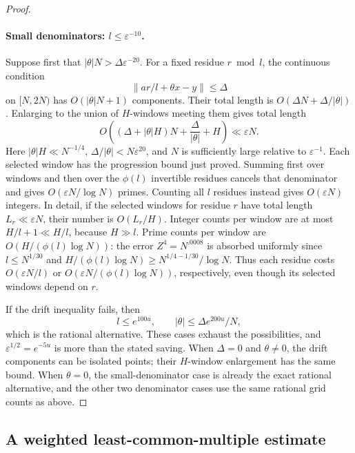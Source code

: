 \begin{proof}
\paragraph{Small denominators: $l\le\varepsilon^{-10}$.}
Suppose first that $|\theta|N>\Delta\varepsilon^{-20}$. For a fixed
residue $r\bmod l$, the continuous condition
\[
 \|ar/l+\theta x-y\|\le\Delta
\]
on $[N,2N)$ has $O(|\theta|N+1)$ components. Their total length is
$O(\Delta N+\Delta/|\theta|)$. Enlarging to the union of $H$-windows
meeting them gives total length
\[
 O\left((\Delta+|\theta|H)N+
              \frac{\Delta}{|\theta|}+H\right)
 \ll\varepsilon N.
\]
Here $|\theta|H\ll N^{-1/4}$,
$\Delta/|\theta|<N\varepsilon^{20}$, and $N$ is sufficiently large
relative to $\varepsilon^{-1}$. Each selected window has the
progression bound just proved. Summing first over windows and then over
the $\phi(l)$ invertible residues cancels that denominator and gives
$O(\varepsilon N/\log N)$ primes. Counting all $l$ residues instead
gives $O(\varepsilon N)$ integers.
In detail, if the selected windows for residue $r$ have total length
$L_r\ll\varepsilon N$, their number is $O(L_r/H)$. Integer counts per
window are at most $H/l+1\ll H/l$, because $H\gg l$. Prime counts per
window are $O(H/(\phi(l)\log N))$: the error $Z^4=N^{.0008}$ is
absorbed uniformly since $l\le N^{1/30}$ and
$H/(\phi(l)\log N)\ge N^{1/4-1/30}/\log N$. Thus each residue costs
$O(\varepsilon N/l)$ or $O(\varepsilon N/(\phi(l)\log N))$,
respectively, even though its selected windows depend on $r$.

If the drift inequality fails, then
\[
 l\le e^{100u},\qquad
 |\theta|\le\Delta e^{200u}/N,
\]
which is the rational alternative. These cases exhaust the possibilities,
and $\varepsilon^{1/2}=e^{-5u}$ is more than the stated saving.
When $\Delta=0$ and $\theta\ne0$, the drift components can be isolated
points; their $H$-window enlargement has the same bound. When
$\theta=0$, the small-denominator case is already the exact rational
alternative, and the other two denominator cases use the same rational
grid counts as above.
\end{proof}

\subsection{A weighted least-common-multiple estimate}

